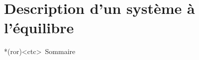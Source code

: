 \documentclass[../../main/main.tex]{subfiles}
\begin{document}
\setcounter{chapter}{0}


\chapter{Description d'un système à l'équilibre}


\begin{tcn}*(ror)<ctc>{\iconsomm~Sommaire}
	\vspace{-15pt}
	\minitoc
	\vspace{-25pt}
\end{tcn}

\end{document}

